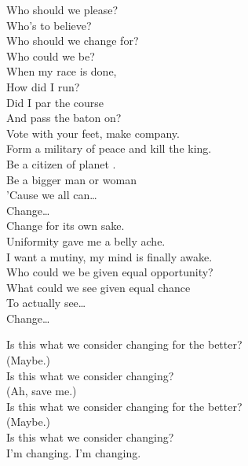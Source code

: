 
\label{album:changes}





Who should we please? \\
Who's to believe? \\
Who should we change for? \\
Who could we be? \\

When my race is done, \\
How did I run? \\
Did I par the course \\
And pass the baton on? \\

Vote with your feet, make company. \\
Form a military of peace and kill the king. \\
Be a citizen of planet . \\
Be a bigger man or woman \\
'Cause we all can… \\

Change… \\

Change for its own sake. \\
Uniformity gave me a belly ache. \\
I want a mutiny, my mind is finally awake. \\
Who could we be given equal opportunity? \\
What could we see given equal chance \\
To actually see… \\

Change… \\


Is this what we consider changing for the better? \\
(Maybe.) \\
Is this what we consider changing? \\
(Ah, save me.) \\
Is this what we consider changing for the better? \\
(Maybe.) \\
Is this what we consider changing? \\
I'm changing. I'm changing. \\


